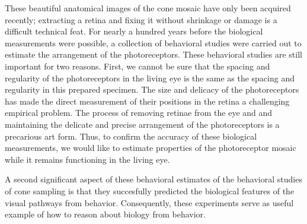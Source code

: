 These beautiful anatomical images of the cone mosaic
have only been acquired recently;
extracting a retina and fixing it without shrinkage
or damage is a difficult technical feat.
For nearly a hundred years before the biological measurements were possible,
a collection of behavioral studies were carried
out to estimate
the arrangement of the photoreceptors.
These behavioral studies are
still important for two reasons.
First, we cannot be sure that the spacing and regularity
of the photoreceptors in the living eye is the same as the
spacing and regularity in this prepared specimen.
The size and delicacy of the photoreceptors has made
the direct measurement of their positions in the retina
a challenging empirical problem.
The process of removing retinae from the eye and and maintaining
the delicate and precise arrangement of the photoreceptors is
a precarious art form.
Thus, to confirm the accuracy of these biological measurements,
we would like to estimate properties of the photoreceptor mosaic
while it remains functioning in the living eye.

A second significant aspect of these behavioral estimates
of the behavioral studies of cone sampling
is that they succesfully predicted the
biological features of the visual pathways
from behavior.
Consequently, these experiments serve as useful example
of how to reason about biology from behavior.
